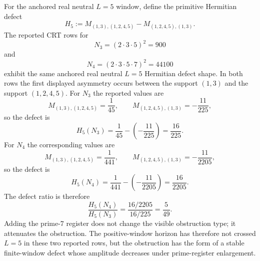 \begin{principle}
\label{prin:innovation-input-primorial-square-homomorphic-delay}
For the anchored real neutral $L=5$ window, define the primitive
Hermitian defect
$$
H_5
:=
M_{(1,3),(1,2,4,5)}
-
M_{(1,2,4,5),(1,3)}.
$$
The reported CRT rows for
$$
N_3=(2\cdot3\cdot5)^2=900
$$
and
$$
N_4=(2\cdot3\cdot5\cdot7)^2=44100
$$
exhibit the same anchored real neutral $L=5$ Hermitian defect shape. In
both rows the first displayed asymmetry occurs between the support
$(1,3)$ and the support $(1,2,4,5)$. For $N_3$ the reported values are
$$
M_{(1,3),(1,2,4,5)}=\frac1{45},
\qquad
M_{(1,2,4,5),(1,3)}=-\frac{11}{225},
$$
so the defect is
$$
H_5(N_3)
=
\frac1{45}-\left(-\frac{11}{225}\right)
=
\frac{16}{225}.
$$
For $N_4$ the corresponding values are
$$
M_{(1,3),(1,2,4,5)}=\frac1{441},
\qquad
M_{(1,2,4,5),(1,3)}=-\frac{11}{2205},
$$
so the defect is
$$
H_5(N_4)
=
\frac1{441}-\left(-\frac{11}{2205}\right)
=
\frac{16}{2205}.
$$
The defect ratio is therefore
$$
\frac{H_5(N_4)}{H_5(N_3)}
=
\frac{16/2205}{16/225}
=
\frac5{49}.
$$
Adding the prime-$7$ register does not change the visible obstruction
type; it attenuates the obstruction. The positive-window horizon has
therefore not crossed $L=5$ in these two reported rows, but the obstruction
has the form of a stable finite-window defect whose amplitude decreases
under prime-register enlargement.
\end{principle}

